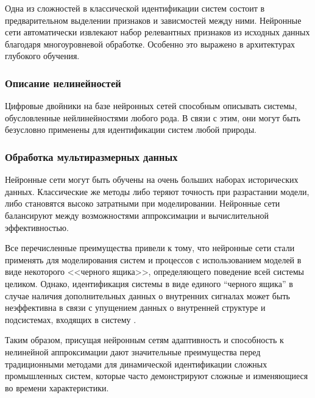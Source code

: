 Одна из сложностей в классической идентификации систем состоит в
предварительном выделении признаков и зависмостей между ними. Нейронные сети
автоматически извлекают набор релевантных признаков из исходных данных
благодаря многоуровневой обработке. Особенно это выражено в архитектурах
глубокого обучения.

\subsubsection{Описание нелинейностей}

Цифровые двойники на базе нейронных сетей способным описывать системы,
обусловленные нейлинейностями любого рода. В связи с этим, они могут быть
безусловно применены для идентификации систем любой природы.

\subsubsection{Обработка мультиразмерных данных}

Нейронные сети могут быть обучены на очень больших наборах
исторических данных. Классические же методы либо теряют точность при
разрастании модели, либо становятся высоко затратными при моделировании.
Нейронные сети балансируют между возможностями аппроксимации и вычислительной
эффективностью.


Все перечисленные преимущества привели к тому, что
нейронные сети стали применять для моделирования
систем и процессов с использованием моделей в виде
некоторого <<черного ящика>>, определяющего
поведение всей системы целиком. Однако,
идентификация системы в виде единого “черного ящика”
в случае наличия дополнительных данных о внутренних
сигналах может быть неэффективна в связи с упущением
данных о внутренней структуре и подсистемах,
входящих в систему \cite{bib:ident}. 

Таким образом, присущая нейронным сетям адаптивность и способность к нелинейной
аппроксимации дают значительные преимущества перед традиционными методами для
динамической идентификации сложных промышленных систем, которые часто
демонстрируют сложные и изменяющиеся во времени характеристики.


